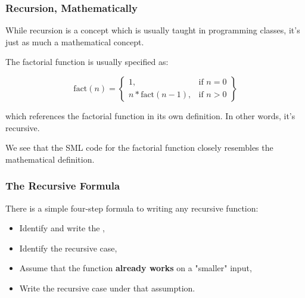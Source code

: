 \documentclass[aspectratio=169, handout]{beamer}
\begin{document}
\begin{frame}[fragile]
  \frametitle{Recursion, Mathematically}

  While recursion is a concept which is usually taught in programming classes,
  it's just as much a mathematical concept.

  \pause
  \vspace{\fill}

  The factorial function is usually specified as:

  \vspace{5pt}

  \begin{equation}
    \text{fact}(n) =
    \left\{
        \begin{array}{lr}
            1, & \text{if } n = 0\\
            n * \text{fact}(n - 1), & \text{if } n > 0
        \end{array}
    \right\}
  \end{equation}

  \vspace{5pt}

  which references the factorial function in its own definition. In other words, it's
  recursive.

  \pause
  \vspace{\fill}

  We see that the SML code for the factorial function closely resembles the mathematical
  definition.

  \rprs
\end{frame}

\begin{frame}[fragile]
  \frametitle{The Recursive Formula}

  There is a simple four-step formula to writing any recursive function:

  \pause
  \vspace{5pt}

  \begin{itemize}
    \item Identify and write the , \pause
    \item Identify the recursive case, \pause
    \item Assume that the function \textbf{already works} on a "smaller" input, \pause
    \item Write the recursive case under that assumption.
  \end{itemize}

  \pause
  \vspace{\fill}

\end{frame}
\end{document}

